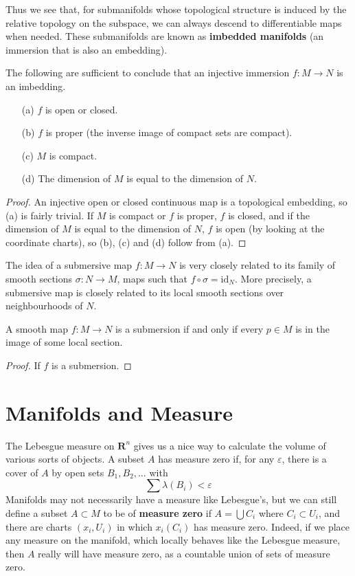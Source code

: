 Thus we see that, for submanifolds whose topological structure is induced by the relative topology on the subspace, we can always descend to differentiable maps when needed. These submanifolds are known as {\bf imbedded manifolds} (an immersion that is also an embedding).

\begin{theorem}
    The following are sufficient to conclude that an injective immersion $f: M \to N$ is an imbedding.
    \begin{enumerate}
        \item[(a)] $f$ is open or closed.
        \item[(b)] $f$ is proper (the inverse image of compact sets are compact).
        \item[(c)] $M$ is compact.
        \item[(d)] The dimension of $M$ is equal to the dimension of $N$.
    \end{enumerate}
\end{theorem}
\begin{proof}
    An injective open or closed continuous map is a topological embedding, so (a) is fairly trivial. If $M$ is compact or $f$ is proper, $f$ is closed, and if the dimension of $M$ is equal to the dimension of $N$, $f$ is open (by looking at the coordinate charts), so (b), (c) and (d) follow from (a).
\end{proof}

The idea of a submersive map $f: M \to N$ is very closely related to its family of smooth sections $\sigma: N \to M$, maps such that $f \circ \sigma = \text{id}_N$. More precisely, a submersive map is closely related to its local smooth sections over neighbourhoods of $N$.

\begin{theorem}
    A smooth map $f: M \to N$ is a submersion if and only if every $p \in M$ is in the image of some local section.
\end{theorem}
\begin{proof}
    If $f$ is a submersion.
\end{proof}

\section{Manifolds and Measure}

The Lebesgue measure on $\mathbf{R}^n$ gives us a nice way to calculate the volume of various sorts of objects. A subset $A$ has measure zero if, for any $\varepsilon$, there is a cover of $A$ by open sets $B_1, B_2, \dots$ with
%
\[ \sum \lambda(B_i) < \varepsilon \]
%
Manifolds may not necessarily have a measure like Lebesgue's, but we can still define a subset $A \subset M$ to be of {\bf measure zero} if $A = \bigcup C_i$ where $C_i \subset U_i$, and there are charts $(x_i,U_i)$ in which $x_i(C_i)$ has measure zero. Indeed, if we place any measure on the manifold, which locally behaves like the Lebesgue measure, then $A$ really will have measure zero, as a countable union of sets of measure zero.

